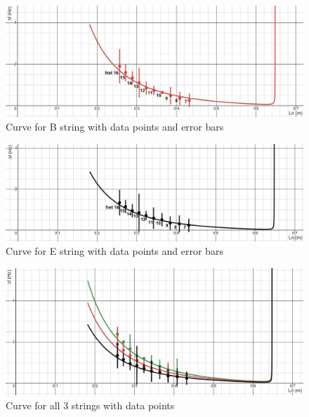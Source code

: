 \begin{figure}[!htb]
    \includegraphics[width = \textwidth]{ee/compare b string.png}
    \caption{Curve for B string with data points and error bars} \label{fig10}
\end{figure}
\begin{figure}[!htb]
    \includegraphics[width = \textwidth]{ee/compare e string.png}
    \caption{Curve for E string with data points and error bars} \label{fig11}
\end{figure}
\begin{figure}[!htb]
    \includegraphics[width = \textwidth]{ee/all 3.png}
    \caption{Curve for all 3 strings with data points} \label{fig12}
\end{figure}
